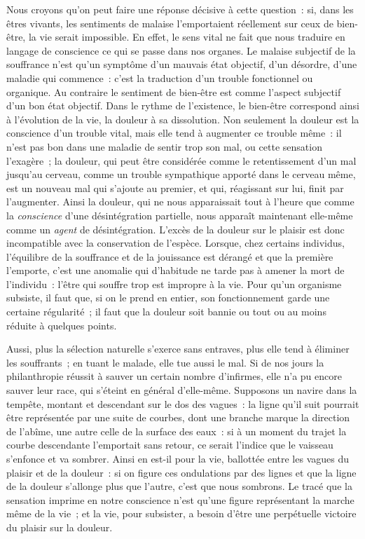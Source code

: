 \documentclass[french,twoside]{book} %
\begin{document}
Nous croyons qu’on peut faire une réponse décisive à cette question : si, dans les êtres vivants, les sentiments de malaise l’emportaient réellement sur ceux de bien-être, la vie serait impossible. En effet, le sens vital ne fait que nous traduire en langage de conscience ce qui se passe dans nos organes. Le malaise subjectif de la souffrance n’est qu’un symptôme d’un mauvais état objectif, d’un désordre, d’une maladie qui commence : c’est la traduction d’un trouble fonctionnel ou organique. Au contraire le sentiment de bien-être est comme l’aspect subjectif d’un bon état objectif. Dans le rythme de l’existence, le bien-être correspond ainsi à l’évolution de la vie, la douleur à sa dissolution. Non seulement la douleur est la conscience d’un trouble vital, mais elle tend à augmenter ce trouble même : il n’est pas bon dans une maladie de sentir trop son mal, ou cette sensation l’exagère ; la douleur, qui peut être considérée comme le retentissement d’un mal jusqu’au cerveau, comme un trouble sympathique apporté dans le cerveau même, est un nouveau mal qui s’ajoute au premier, et qui, réagissant sur lui, finit par l’augmenter. Ainsi la douleur, qui ne nous apparaissait tout à l’heure que comme la \emph{conscience} d’une désintégration partielle, nous apparaît maintenant elle-même comme un \emph{agent} de désintégration. L’excès de la douleur sur le plaisir est donc incompatible avec la conservation de l’espèce. Lorsque, chez certains individus, l’équilibre de la souffrance et de la jouissance est dérangé et que la première l’emporte, c’est une anomalie qui d’habitude ne tarde pas à amener la mort de l’individu : l’être qui souffre trop est impropre à la vie. Pour qu’un organisme subsiste, il faut que, si on le prend en entier, son fonctionnement garde une certaine régularité ; il faut que la douleur soit bannie ou tout ou au moins réduite à quelques points.\par
Aussi, plus la sélection naturelle s’exerce sans entraves, plus elle tend à éliminer les souffrants ; en tuant le malade, elle tue aussi le mal. Si de nos jours la philanthropie réussit à sauver un certain nombre d’infirmes, elle n’a pu encore sauver leur race, qui s’éteint en général d’elle-même. Supposons un navire dans la tempête, montant et descendant sur le dos des vagues : la ligne qu’il suit pourrait être représentée par une suite de courbes, dont une branche marque la direction de l’abîme, une autre celle de la surface des eaux : si à un moment du trajet la courbe descendante l’emportait sans retour, ce serait l’indice que le vaisseau s’enfonce et va sombrer. Ainsi en est-il pour la vie, ballottée entre les vagues du plaisir et de la douleur : si on figure ces ondulations par des lignes et que la ligne de la douleur s’allonge plus que l’autre, c’est que nous sombrons. Le tracé que la sensation imprime en notre conscience n’est qu’une figure représentant la marche même de la vie ; et la vie, pour subsister, a besoin d’être une perpétuelle victoire du plaisir sur la douleur.\par
\end{document}
